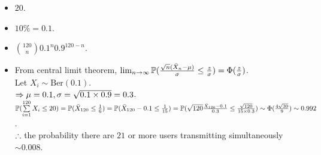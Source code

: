 \begin{pr}$ $
\begin{itemize}
\item $20$.
\item $10\%=0.1$.
\item $\binom{120}n0.1^n0.9^{120-n}$.
\item %
From central limit theorem, $\lim_{n\to\infty}\P(\frac{\sqrt n(\bar X_n-\mu)}\sigma\leq\frac z\sigma)=\Phi(\frac z\sigma)$.\\
Let $X_i\sim\mathrm{Ber}(0.1)$.\\
$\then\mu=0.1, \sigma=\sqrt{0.1\times0.9}=0.3$.\\
$\P(\suml_{i=1}^{120}X_i\leq20)=\P(\bar X_{120}\leq\frac16)=\P(\bar X_{120}-0.1\leq\frac1{15})=\P(\sqrt{120}\frac{\bar X_{120}-0.1}{0.3}\leq\frac{\sqrt{120}}{15\times0.3})\sim\Phi(\frac{4\sqrt{30}}9)\sim0.992$.\\
$\so$ the probability there are $21$ or more users transmitting simultaneously $\sim0.008$.
\end{itemize}
\end{pr}
